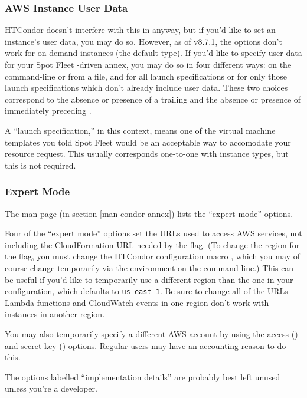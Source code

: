 \subsubsection{AWS Instance User Data}

HTCondor doesn't interfere with this in anyway, but if you'd like to set
an instance's user data, you may do so.  However, as of v8.7.1, the
 options don't work for on-demand instances (the default
type).  If you'd like to specify user data for your Spot Fleet -driven
annex, you may do so in four different ways: on the command-line or
from a file, and for all launch specifications or for only those launch
specifications which don't already include user data.  These two choices
correspond to the absence or presence of a trailing  and the
absence or presence of  immediately preceding .

A ``launch specification,'' in this context, means one of the virtual machine
templates you told Spot Fleet would be an acceptable way to accomodate your
resource request.  This usually corresponds one-to-one with instance types,
but this is not required.

\subsubsection{Expert Mode}

The man page (in section \ref{man-condor-annex}) lists the ``expert
mode'' options.

Four of the ``expert mode'' options set the URLs used to access AWS services,
not including the CloudFormation URL needed by the  flag.  (To
change the region for the  flag, you must change the HTCondor
configuration macro , which you may of
course change temporarily via the environment on the command line.)  This
can be useful if you'd like to temporarily use a different region than the
one in your configuration, which defaults to {\tt us-east-1}.  Be sure to
change all of the URLs -- Lambda functions and CloudWatch events in one
region don't work with instances in another region.


You may also temporarily specify a different AWS account by using the
access () and
secret key () options.  Regular users may have
an accounting reason to do this.

The options labelled ``implementation details'' are probably best left
unused unless you're a developer.

